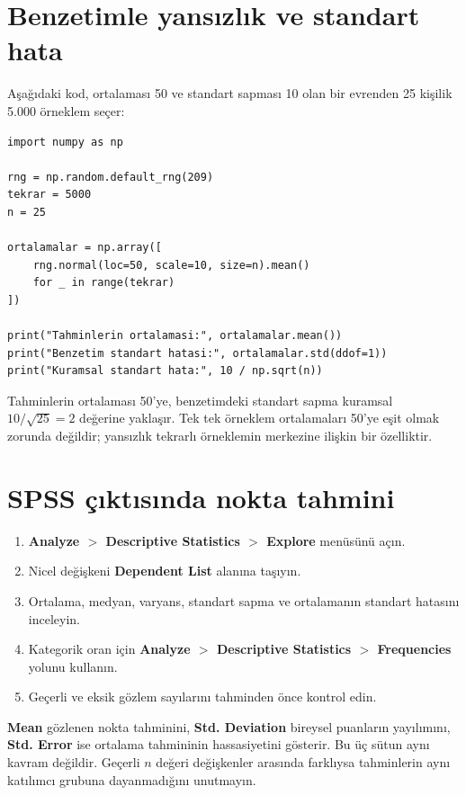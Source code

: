 \section{Benzetimle yansızlık ve standart hata}

Aşağıdaki kod, ortalaması 50 ve standart sapması 10 olan bir evrenden 25
kişilik 5.000 örneklem seçer:

\begin{lstlisting}
import numpy as np

rng = np.random.default_rng(209)
tekrar = 5000
n = 25

ortalamalar = np.array([
    rng.normal(loc=50, scale=10, size=n).mean()
    for _ in range(tekrar)
])

print("Tahminlerin ortalamasi:", ortalamalar.mean())
print("Benzetim standart hatasi:", ortalamalar.std(ddof=1))
print("Kuramsal standart hata:", 10 / np.sqrt(n))
\end{lstlisting}

Tahminlerin ortalaması 50'ye, benzetimdeki standart sapma kuramsal
$10/\sqrt{25}=2$ değerine yaklaşır. Tek tek örneklem ortalamaları 50'ye eşit
olmak zorunda değildir; yansızlık tekrarlı örneklemin merkezine ilişkin bir
özelliktir.

\section{SPSS çıktısında nokta tahmini}

\begin{enumerate}
  \item \textbf{Analyze $>$ Descriptive Statistics $>$ Explore} menüsünü açın.
  \item Nicel değişkeni \textbf{Dependent List} alanına taşıyın.
  \item Ortalama, medyan, varyans, standart sapma ve ortalamanın standart hatasını inceleyin.
  \item Kategorik oran için \textbf{Analyze $>$ Descriptive Statistics $>$ Frequencies} yolunu kullanın.
  \item Geçerli ve eksik gözlem sayılarını tahminden önce kontrol edin.
\end{enumerate}

\begin{outputguidebox}
\textbf{Mean} gözlenen nokta tahminini, \textbf{Std. Deviation} bireysel
puanların yayılımını, \textbf{Std. Error} ise ortalama tahmininin hassasiyetini
gösterir. Bu üç sütun aynı kavram değildir. Geçerli $n$ değeri değişkenler
arasında farklıysa tahminlerin aynı katılımcı grubuna dayanmadığını unutmayın.
\end{outputguidebox}

